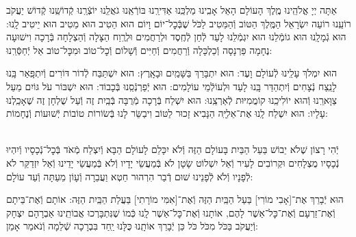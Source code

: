 \documentclass[twoside, openany, parskip=half, 11pt]{book}
\begin{document}
אַתָּה יְיָ אֱלֹהֵֽינוּ מֶֽלֶךְ הָעוֹלָם הָאֵל אָבִֽינוּ מַלְכֵּֽנוּ אַדִּירֵֽנוּ בּוֹרְֿאֵֽנוּ גֹאֲלֵֽנוּ יוֹצְֿרֵֽנוּ קְֿדוֹשֵֽׁנוּ קְֿדוֹשׁ יַעֲקֹב רוֹעֵֽנוּ רוֹעֵה יִשְׂרָאֵל הַמֶּֽלֶךְ הַטּוֹב וְֿהַמֵּטִיב לַכֹּל שֶׁבְּֿכׇל־יוֹם וָיוֹם הוּא הֵטִיב הוּא מֵטִיב הוּא יֵיטִיב לָֽנוּ: הוּא גְֿמָלָֽנוּ הוּא גוֹמְֿלֵנוּ הוּא יִגְמְֿלֵנוּ לָעַד לְֿחֵן לְֿחֶֽסֶד וּלְרַחֲמִים וּלְרֶֽוַח הַצָּלָה וְֿהַצְלָחָה בְּֿרָכָה וִישׁוּעָה נֶחָמָה פַּרְנָסָה וְֿכַלְכָּלָה וְֿרַחֲמִים וְֿחַיִּים וְֿשָׁלוֹם וְֿכׇל־טוֹב וּמִכׇּל־טוֹב אַל יְֿחַסְּֿרֵֽנוּ:

הוּא יִמְלֹךְ עָלֵֽינוּ לְֿעוֹלָם וָעֶד:
הוּא יִתְבָּרַךְ בַּשָּׁמַֽיִם וּבָאָֽרֶץ:
הוּא יִשְׁתַּבַּח לְֿדוֹר דּוֹרִים וְֿיִתְפָּֽאַר בָּֽנוּ לָנֵֽצַח נְֿצָחִים
וְֿיִתְהַדַּר בָּֽנוּ לָעַד וּלְעוֹלְֿמֵי עוֹלָמִים:
הוּא יְֿפַרְנְֿסֵֽנוּ בְּֿכָבוֹד:
הוּא יִשְׁבּוֹר עֹל גּוֹיִם מֵעַל צַוָּארֵֽנוּ וְֿהוּא יוֹלִיכֵֽנוּ קוֹמֲמִיּוּת לְֿאַרְצֵֽנוּ:
הוּא יִשְׁלַח בְּֿרָכָה מְֿרֻבָּה בְּֿבַֽיִת זֶה וְֿעַל שֻׁלְחָן זֶה שֶׁאָכַֽלְנוּ עָלָיו:
הוּא יִשְׁלַח לָֽנוּ אֶת־אֵלִיָּֽה הַנָּבִיא זָכוּר לַטּוֹב וִיבַשֵּׂר לָנוּ בְּֿשׂוֹרוֹת טוֹבוֹת יְֿשׁוּעוֹת וְֿנֶחָמוֹת:


\begin{footnotesize}
\\
יְֿהִי רָצוֹן שֶׁלֹא יֵבוֹשׁ בַּעַל הַבַּיִת בָּעוֹלָם הַזֶּה וְֿלֹא יִכָּלֵם לָעוֹלָם הַבָּא וְֿיִצְלַח מְֿאֹד בְּֿכׇל־נְֿכָסָיו וְֿיִהְיוּ נְֿכָסָיו מֻצְלָחִים וּקְרוֹבִים לָעִיר וְֿאַל יִשְׁלוֹט שָׂטָן לֹא בְּֿמַעֲשֵׂי יָדָיו וְֿלֹא בְּֿמַעֲשֵׂי יָדֵינוּ וְֿאַל יִזְדַקֵּר לֹא לְֿפָנָיו וְֿלֹא לְֿפָנֵינוּ שׁוּם דְֿבַר הִרְהוּר חֵטְא וַעֲבֵרָה וְֿעָוֹן מֵעַתָּה וְֿעַד עוֹלָם:

\end{footnotesize}

הוּא יְֿבָרֵךְ אֶת־[אָבִי מוֹרִי] בַּעַל הַבַּֽיִת הַזֶּה וְֿאֶת־[אִמִּי מוֹרָתִי] בַּעֲלַת הַבַּֽיִת הַזֶּה: אוֹתָם וְֿאֶת־בֵּיתָם וְֿאֶת־זַרְעָם וְֿאֶת־כׇּל־אַשֶׁר לָהֶם, אוֹתָנוּ וְֿאֶת־כׇּל־אַשֶׁר לָֽנוּ כְּֿמוֹ שֶׁנִּתְבָּרְכוּ אֲבוֹתֵֽינוּ אַבְרָהָם יִצְחָק וְֿיַעֲקֹב בַּכֹּל מִכֹּל כֹּל כֵּן יְֿבָרֵךְ אוֹתָֽנוּ כֻּלָּנוּ יַֽחַד בִּבְרָכָה שְֿׁלֵמָה וְֿנֹאמַר אָמֵן:
\end{document}
